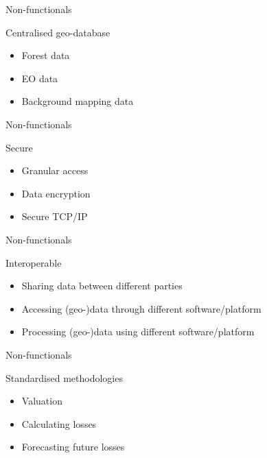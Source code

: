 \begin{frame}{Non-functionals}
	\begin{block}{Centralised geo-database}
		\begin{itemize}
			\item Forest data
			\item EO data
			\item Background mapping data
		\end{itemize}
	\end{block}
	
\end{frame}

\begin{frame}{Non-functionals}
	\begin{block}{Secure}
		\begin{itemize}
			\item Granular access
			\item Data encryption
			\item Secure TCP/IP
		\end{itemize}
	\end{block}
	
\end{frame}

\begin{frame}{Non-functionals}
	\begin{block}{Interoperable}
		\begin{itemize}
			\item Sharing data between different parties
			\item Accessing (geo-)data through different software/platform
			\item Processing (geo-)data using different software/platform
		\end{itemize}
	\end{block}
	
\end{frame}

\begin{frame}{Non-functionals}
	\begin{block}{Standardised methodologies}
		\begin{itemize}
			\item Valuation
			\item Calculating losses
			\item Forecasting future losses
		\end{itemize}
	\end{block}
	
\end{frame}

